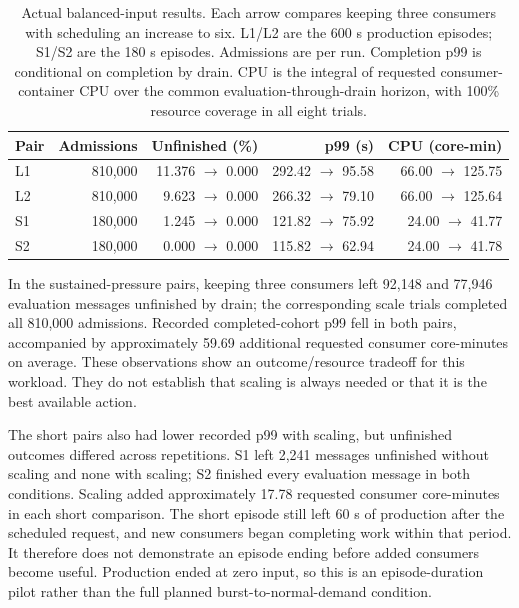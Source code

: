 \begin{table}[!htbp]
\centering\small
\setlength{\tabcolsep}{4pt}
\begin{tabular}{@{}lrrrr@{}}
\toprule
\textbf{Pair} & \textbf{Admissions} & \textbf{Unfinished (\%)} & \textbf{p99 (s)} & \textbf{CPU (core-min)}\\
\midrule
L1 & 810,000 & 11.376 $\to$ 0.000 & 292.42 $\to$ 95.58 & 66.00 $\to$ 125.75\\
L2 & 810,000 & 9.623 $\to$ 0.000 & 266.32 $\to$ 79.10 & 66.00 $\to$ 125.64\\
S1 & 180,000 & 1.245 $\to$ 0.000 & 121.82 $\to$ 75.92 & 24.00 $\to$ 41.77\\
S2 & 180,000 & 0.000 $\to$ 0.000 & 115.82 $\to$ 62.94 & 24.00 $\to$ 41.78\\
\bottomrule
\end{tabular}
\caption{Actual balanced-input results. Each arrow compares keeping three consumers with scheduling an increase to six. L1/L2 are the 600 s production episodes; S1/S2 are the 180 s episodes. Admissions are per run. Completion p99 is conditional on completion by drain. CPU is the integral of requested consumer-container CPU over the common evaluation-through-drain horizon, with 100\% resource coverage in all eight trials.}
\label{tab:preliminary-core}
\end{table}

In the sustained-pressure pairs, keeping three consumers left 92,148 and 77,946 evaluation messages unfinished by drain; the corresponding scale trials completed all 810,000 admissions. Recorded completed-cohort p99 fell in both pairs, accompanied by approximately 59.69 additional requested consumer core-minutes on average. These observations show an outcome/resource tradeoff for this workload. They do not establish that scaling is always needed or that it is the best available action.

The short pairs also had lower recorded p99 with scaling, but unfinished outcomes differed across repetitions. S1 left 2,241 messages unfinished without scaling and none with scaling; S2 finished every evaluation message in both conditions. Scaling added approximately 17.78 requested consumer core-minutes in each short comparison. The short episode still left 60 s of production after the scheduled request, and new consumers began completing work within that period. It therefore does not demonstrate an episode ending before added consumers become useful. Production ended at zero input, so this is an episode-duration pilot rather than the full planned burst-to-normal-demand condition.

